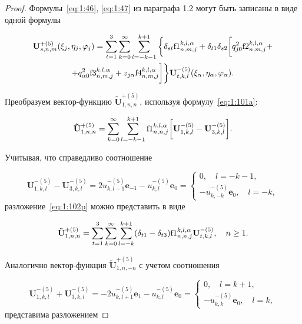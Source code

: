 \begin{russian}
\begin{proof}
Формулы~\eqref{eq:1:46}, \eqref{eq:1:47} из параграфа 1.2 могут быть записаны в виде одной формулы

\begin{multline}\label{eq:1:101a}
\mathbf{U}_{s,n,m}^{+(5)}(\xi_j,\eta_j,\varphi_j)=\sum\limits_{t=1}^3\sum\limits_{k=0}^\infty\sum\limits_{l=-k-1}^{k+1}\bigg\{\delta_{st}{\rm f1}_{n,m,j}^{k,l,\alpha}+\delta_{t1}\delta_{s2}\bigg[q_{j0}^2{\rm f2}_{n,m,j}^{k,l,\alpha}+ \\
+ q_{\alpha 0}^2{\rm f3}_{n,m,j}^{k,l,\alpha}+z_{j\alpha}{\rm f4}_{n,m,j}^{k,l,\alpha}\bigg]\bigg\}\mathbf{U}_{t,k,l}^{-(5)}(\xi_\alpha,\eta_\alpha,\varphi_\alpha).
\end{multline}

Преобразуем вектор-функцию $\mathbf{\tilde U}_{1,n,n}^{+(5)}$, используя формулу~\eqref{eq:1:101a}:

\begin{equation}
\mathbf{\tilde U}_{1,n,n}^{+(5)}=\sum\limits_{k=0}^\infty\sum\limits_{l=-k-1}^{k+1}{\rm f1}_{n,n,j}^{k,l,\alpha}\bigg[\mathbf{U}_{1,k,l}^{-(5)}-\mathbf{U}_{3,k,l}^{-(5)}\bigg].
\label{eq:1:102p}
\end{equation}

\noindent Учитывая, что справедливо соотношение

\begin{equation*}
\mathbf{U}_{1,k,l}^{-(5)}-\mathbf{U}_{3,k,l}^{-(5)}=2u_{k,l-1}^{-(5)}\mathbf{e}_{-1}-u_{k,l}^{-(5)}\mathbf{e}_0=
\begin{cases}
0,\quad l=-k-1, \\
-u_{k,-k}^{-(5)}\mathbf{e}_0,\quad l=-k,
\end{cases}
\end{equation*}
разложение~\eqref{eq:1:102p} можно представить в виде

\begin{equation}
\mathbf{\tilde U}_{1,n,n}^{+(5)}=\sum\limits_{t=1}^3\sum\limits_{k=0}^\infty\sum\limits_{l=-k}^{k+1}(\delta_{t1}-\delta_{t3}){\rm f1}_{n,n,j}^{k,l,\alpha}\mathbf{U}_{t,k,l}^{-(5)},\quad n\ge 1.
\label{eq:1:103p}
\end{equation}

Аналогично вектор-функция $\mathbf{\tilde U}_{1,n,-n}^{+(5)}$ с учетом соотношения

\begin{equation*}
\mathbf{U}_{1,k,l}^{-(5)}+\mathbf{U}_{3,k,l}^{-(5)}=-2u_{k,l+1}^{-(5)}\mathbf{e}_{1}-u_{k,l}^{-(5)}\mathbf{e}_0=
\begin{cases}
0,\quad l=k+1, \\
-u_{k,k}^{-(5)}\mathbf{e}_0,\quad l=k,
\end{cases}
\end{equation*}
представима разложением


\end{proof}
\end{russian}
